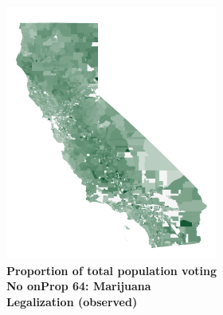 \documentclass[twoside,11pt]{article}
\begin{document}
\begin{figure}[p]
\begin{subfigure}{\textwidth}
\begin{subfigure}{.45\textwidth}
            \includegraphics[width=\textwidth]{map_obs31.png}
            \caption*{\centering \footnotesize \textbf{Proportion of total population voting No on\newline Prop 64: Marijuana Legalization (observed)}}
        \end{subfigure}
        \hfill
        \begin{subfigure}{.45\textwidth}

\end{subfigure}
\end{subfigure}
\end{figure}
\end{document}
